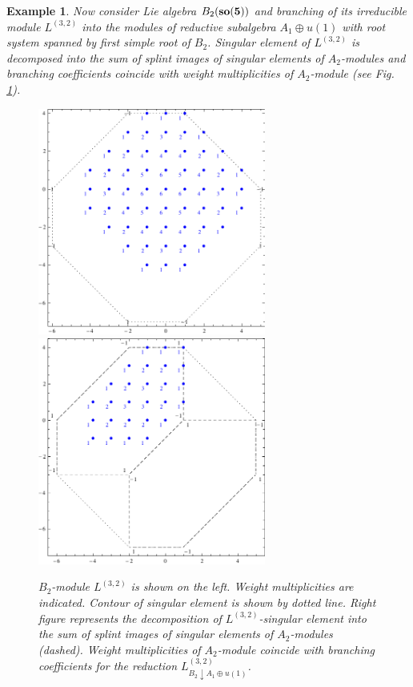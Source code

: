 \documentclass[12pt]{article}
\newtheorem{example}{Example}[section]
\begin{document}
\begin{example}
  Now consider Lie algebra $B_{2} (\bf{so}(5))$ and branching of its irreducible module $L^{(3,2)}$ into the modules of reductive subalgebra $A_{1}\oplus u(1)$ with root system spanned by first simple root of $B_{2}$. Singular element of $L^{(3,2)}$ is decomposed into the sum of splint images of singular elements of $A_{2}$-modules and branching coefficients coincide with weight multiplicities of $A_{2}$-module (see Fig. \ref{fig:b2_splint}).

  \begin{figure}[h!bt]
  \hspace*{-1.5cm}

   \includegraphics[width=75mm]{b2}
   \includegraphics[width=75mm]{b2-a2-a1}
  \caption{$B_{2}$-module $L^{(3,2)}$ is shown on the left. Weight multiplicities are indicated. Contour of singular element is shown by dotted line. Right figure represents the decomposition of  $L^{(3,2)}$-singular element into the sum of splint images of singular elements of $A_{2}$-modules (dashed). Weight multiplicities of $A_{2}$-module coincide with branching coefficients for the reduction $L^{(3,2)}_{B_{2}\downarrow A_{1}\oplus u(1)}$.}

 \label{fig:b2_splint}
\end{figure}
\end{example}
\end{document}
